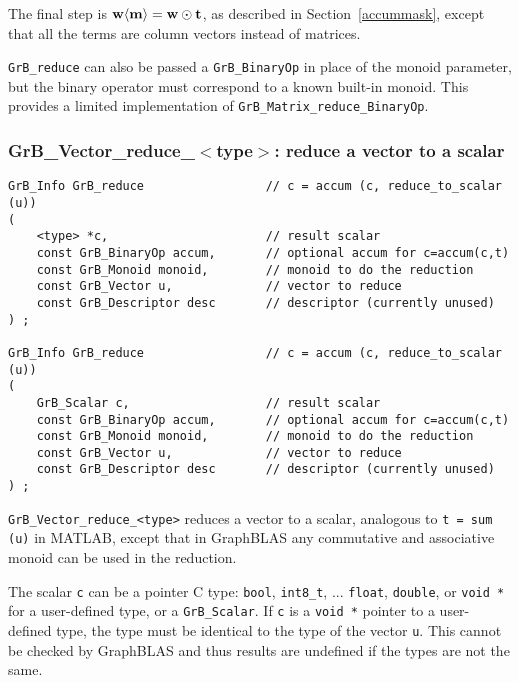 \documentclass[12pt]{article}
\begin{document}
The final step is ${\bf w \langle m \rangle  = w \odot t}$, as described
in Section~\ref{accummask}, except that all the
terms are column vectors instead of matrices.

\verb'GrB_reduce' can also be passed a \verb'GrB_BinaryOp' in place of the
monoid parameter, but the binary operator must correspond to a known
built-in monoid.  This provides a limited implementation of
\verb'GrB_Matrix_reduce_BinaryOp'.

\newpage
\subsubsection{{\sf GrB\_Vector\_reduce\_$<$type$>$:} reduce a vector to a scalar}
\label{reduce_vector_to_scalar}

\begin{mdframed}[userdefinedwidth=6in]
{\footnotesize
\begin{verbatim}
GrB_Info GrB_reduce                 // c = accum (c, reduce_to_scalar (u))
(
    <type> *c,                      // result scalar
    const GrB_BinaryOp accum,       // optional accum for c=accum(c,t)
    const GrB_Monoid monoid,        // monoid to do the reduction
    const GrB_Vector u,             // vector to reduce
    const GrB_Descriptor desc       // descriptor (currently unused)
) ;

GrB_Info GrB_reduce                 // c = accum (c, reduce_to_scalar (u))
(
    GrB_Scalar c,                   // result scalar
    const GrB_BinaryOp accum,       // optional accum for c=accum(c,t)
    const GrB_Monoid monoid,        // monoid to do the reduction
    const GrB_Vector u,             // vector to reduce
    const GrB_Descriptor desc       // descriptor (currently unused)
) ;
\end{verbatim} } \end{mdframed}

\verb'GrB_Vector_reduce_<type>'
reduces a vector to a scalar, analogous to \verb't = sum (u)' in MATLAB,
except that in GraphBLAS any commutative and associative monoid can be used
in the reduction.

The scalar \verb'c' can be a pointer C type: \verb'bool', \verb'int8_t', ...
\verb'float', \verb'double', or \verb'void *' for a user-defined type,
or a \verb'GrB_Scalar'.
If \verb'c' is a \verb'void *' pointer to a user-defined type,
the type must be identical to the type of the vector \verb'u'.
This cannot be checked by GraphBLAS and thus results are undefined if the
types are not the same.
\end{document}
